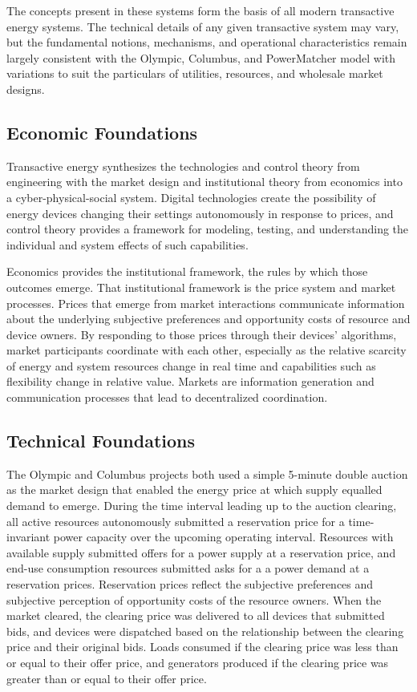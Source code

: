 The concepts present in these systems form the basis of all modern transactive energy systems.  The technical details of any given transactive system may vary, but the fundamental notions, mechanisms, and operational characteristics remain largely consistent with the Olympic, Columbus, and PowerMatcher model with variations to suit the particulars of utilities, resources, and wholesale market designs.

\subsection{Economic Foundations}


Transactive energy synthesizes the technologies and control theory from engineering with the market design and institutional theory from economics into a cyber-physical-social system. Digital technologies create the possibility of energy devices changing their settings autonomously in response to prices, and control theory provides a framework for modeling, testing, and understanding the individual and system effects of such capabilities. 

Economics provides the institutional framework, the rules by which those outcomes emerge. That institutional framework is the price system and market processes. Prices that emerge from market interactions communicate information about the underlying subjective preferences and opportunity costs of resource and device owners. By responding to those prices through their devices' algorithms, market participants coordinate with each other, especially as the relative scarcity of energy and system resources change in real time and capabilities such as flexibility change in relative value. Markets are information generation and communication processes that lead to decentralized coordination.

\subsection{Technical Foundations}

The Olympic and Columbus projects both used a simple 5-minute double auction as the market design that enabled the energy price at which supply equalled demand to emerge.  During the time interval leading up to the auction clearing, all active resources autonomously submitted a reservation price for a time-invariant power capacity over the upcoming operating interval. Resources with available supply submitted offers for a power supply at a reservation price, and end-use consumption resources submitted asks for a a power demand at a reservation prices. Reservation prices reflect the subjective preferences and subjective perception of opportunity costs of the resource owners. When the market cleared, the clearing price was delivered to all devices that submitted bids, and devices were dispatched based on the relationship between the clearing price and their original bids. Loads consumed if the clearing price was less than or equal to their offer price, and generators produced if the clearing price was greater than or equal to their offer price.

